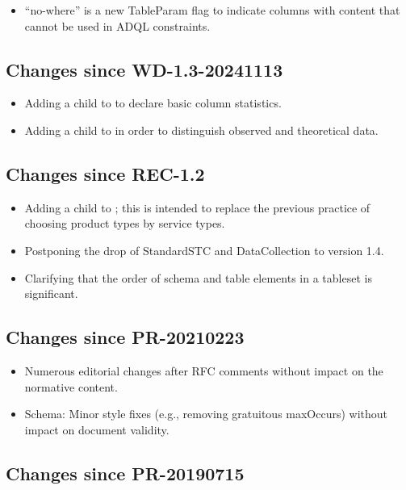 \documentclass[11pt,a4paper]{ivoa}
\begin{document}
\begin{itemize}
\item ``no-where'' is a new TableParam flag to indicate columns with
content that cannot be used in ADQL constraints.
\end{itemize}

\subsection{Changes since WD-1.3-20241113}

\begin{itemize}
\item Adding a  child to  to declare
basic column statistics.
\item Adding a  child to  in order
to distinguish observed and theoretical data.
\end{itemize}

\subsection{Changes since REC-1.2}

\begin{itemize}
\item Adding a  child to ;
this is intended to replace the previous practice of choosing product
types by service types.
\item Postponing the drop of StandardSTC and DataCollection to version
1.4.
\item Clarifying that the order of schema and table elements in a
tableset is significant.
\end{itemize}

\subsection{Changes since PR-20210223}

\begin{itemize}
\item Numerous editorial changes after RFC comments without
impact on the normative content.
\item Schema: Minor style fixes (e.g., removing gratuitous maxOccurs)
without impact on document validity.
\end{itemize}

\subsection{Changes since PR-20190715}
\end{document}

